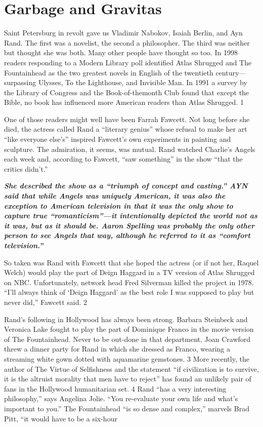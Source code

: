 {\chapter{Garbage and Gravitas} } {\label{Garbage and Gravitas} }{\par}{\textit{	} } {\par}{\par} {\textbf{\textit{	} } } {\par} 
	Saint Petersburg in revolt gave us Vladimir Nabokov, Isaiah Berlin, and Ayn Rand. The first was a novelist, the second a philosopher. The third was neither but thought she was both. Many other people have thought so too. In 1998 readers responding to a Modern Library poll identified Atlas Shrugged and The Fountainhead as the two greatest novels in English of the twentieth century— surpassing Ulysses, To the Lighthouse, and Invisible Man. In 1991 a survey by the Library of Congress and the Book-of-themonth Club found that except the Bible, no book has influenced more American readers than Atlas Shrugged. {\color{blue} 1 } {\par} One of those readers might well have been Farrah Fawcett. Not long before she died, the actress called Rand a “literary genius” whose refusal to make her art “like everyone else’s” inspired Fawcett’s own experiments in painting and sculpture. The admiration, it seems, was mutual. Rand watched Charlie’s Angels each week and, according to Fawcett, “saw something” in the show “that the critics didn’t.”{\par} {\textbf{\textit{She described the show as a “triumph of concept and casting.” AYN said that while Angels was uniquely American, it was also the exception to American television in that it was the only show to capture true “romanticism”—it intentionally depicted the world not as it was, but as it should be. Aaron Spelling was probably the only other person to see Angels that way, although he referred to it as “comfort television.”} } }{\par} So taken was Rand with Fawcett that she hoped the actress (or if not her, Raquel Welch) would play the part of Deign Haggard in a TV version of Atlas Shrugged on NBC. Unfortunately, network head Fred Silverman killed the project in 1978. “I’ll always think of ‘Deign Haggard’ as the best role I was supposed to play but never did,” Fawcett said. {\color{blue} 2 } {\par} Rand’s following in Hollywood has always been strong. Barbara Steinbeck and Veronica Lake fought to play the part of Dominique Franco in the movie version of The Fountainhead. Never to be out-done in that department, Joan Crawford threw a dinner party for Rand in which she dressed as Franco, wearing a streaming white gown dotted with aquamarine gemstones. {\color{blue} 3 } More recently, the author of The Virtue of Selfishness and the statement “if civilization is to survive, it is the altruist morality that men have to reject” has found an unlikely pair of fans in the Hollywood humanitarian set. {\color{blue} 4 } Rand “has a very interesting philosophy,” says Angelina Jolie. “You re-evaluate your own life and what’s important to you.” The Fountainhead “is so dense and complex,” marvels Brad Pitt, “it would have to be a six-hour 